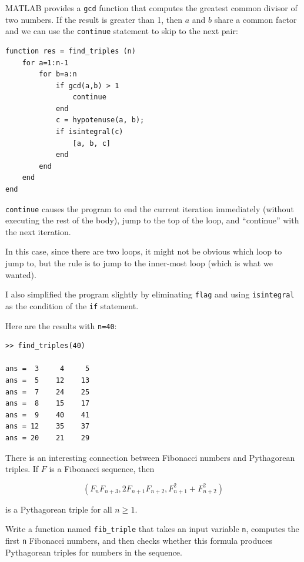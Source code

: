 \documentclass{book}
\begin{document}
MATLAB provides a {\tt gcd} function that computes the greatest common
divisor of two numbers.  If the result is greater than 1, then
$a$ and $b$ share a common factor and we can use the {\tt continue}
statement to skip to the next pair:

\begin{verbatim}
function res = find_triples (n)
    for a=1:n-1
        for b=a:n
            if gcd(a,b) > 1
                continue
            end
            c = hypotenuse(a, b);
            if isintegral(c)
                [a, b, c]
            end
        end
    end
end
\end{verbatim}

{\tt continue} causes the program to end the current iteration
immediately (without executing the rest of the body), jump to
the top of the loop, and ``continue'' with the next iteration.

In this case, since there are two loops, it might not be obvious
which loop to jump to, but the rule is to jump to the inner-most
loop (which is what we wanted).

I also simplified the program slightly by eliminating
{\tt flag} and using {\tt isintegral} as the condition of the
{\tt if} statement.

Here are the results with {\tt n=40}:

\begin{verbatim}
>> find_triples(40)

ans =  3     4     5
ans =  5    12    13
ans =  7    24    25
ans =  8    15    17
ans =  9    40    41
ans = 12    35    37
ans = 20    21    29
\end{verbatim}

There is an interesting connection between Fibonacci numbers and
Pythagorean triples.  If $F$ is a Fibonacci sequence, then

\begin{equation}
(F_n F_{n+3}, 2 F_{n+1} F_{n+2}, F_{n+1}^2 + F_{n+2}^2 )
\end{equation}

is a Pythagorean triple for all $n \ge 1$.

\begin{ex}
Write a function named {\tt fib\_triple} that
takes an input variable {\tt n}, computes
the first {\tt n} Fibonacci numbers, and then checks whether
this formula produces Pythagorean triples for numbers
in the sequence.
\end{ex}
\end{document}
